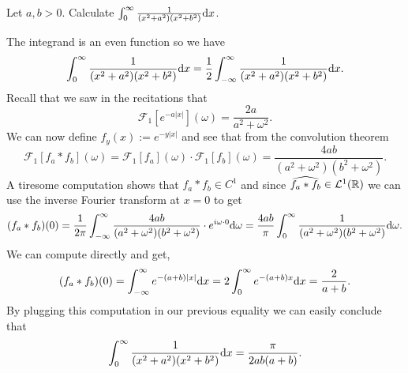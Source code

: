 \documentclass[11pt,a4paper]{article}
\begin{document}
\begin{exercise}
  Let $a,b > 0$.
  Calculate $\int_{0}^{\infty} \frac{1}{(x^2 + a^2) (x^2 + b^2)} \dx$.
\end{exercise}
\begin{solution}
  The integrand is an even function so we have
  \[
    \int_{0}^{\infty} \frac{1}{(x^2 + a^2) (x^2 + b^2)} \dx =
    \half \int_{-\infty}^{\infty} \frac{1}{(x^2 + a^2) (x^2 + b^2)} \dx.
  \]
  Recall that we saw in the recitations that
  \[
    \mathcal F_1\left[e^{-a |x|}\right](\omega) =
    \frac{2a}{a^2 + \omega^2}.
  \]
  We can now define $f_{y}(x) := e^{-y |x|}$ and see that
  from the convolution theorem
  \[
    \mathcal F_1[f_a * f_b](\omega) =
    \mathcal F_1[f_a](\omega) \cdot \mathcal F_1[f_b](\omega) =
    \frac{4ab}{(a^2 + \omega^2) (b^2 + \omega^2)}.
  \]
  A tiresome computation shows that $f_a * f_b \in C^1$
  and since $\widehat{f_a * f_b} \in \mathcal L^1(\mathbb{R})$
  we can use the inverse Fourier transform at $x = 0$ to get
  \[
    (f_a * f_b)(0) =
    \frac{1}{2\pi}
    \int_{-\infty}^{\infty} \frac{4ab}{(a^2 + \omega^2) (b^2 + \omega^2)} \cdot
    e^{i \omega \cdot 0} \mathrm{d} \omega =
    \frac{4ab}{\pi}
    \int_{0}^{\infty} \frac{1}{(a^2 + \omega^2) (b^2 + \omega^2)} \mathrm{d} \omega.
  \]
  We can compute directly and get,
  \[
    (f_a * f_b)(0) =
    \int_{-\infty}^{\infty} e^{-(a + b)|x|} \dx =
    2 \int_{0}^{\infty} e^{-(a + b) x} \dx =
    \frac{2}{a + b}.
  \]
  By plugging this computation in our previous equality we can easily conclude
  that
  \[
    \int_{0}^{\infty} \frac{1}{(x^2 + a^2) (x^2 + b^2)} \dx =
    \frac{\pi}{2ab (a + b)}.
  \]
\end{solution}
\end{document}
